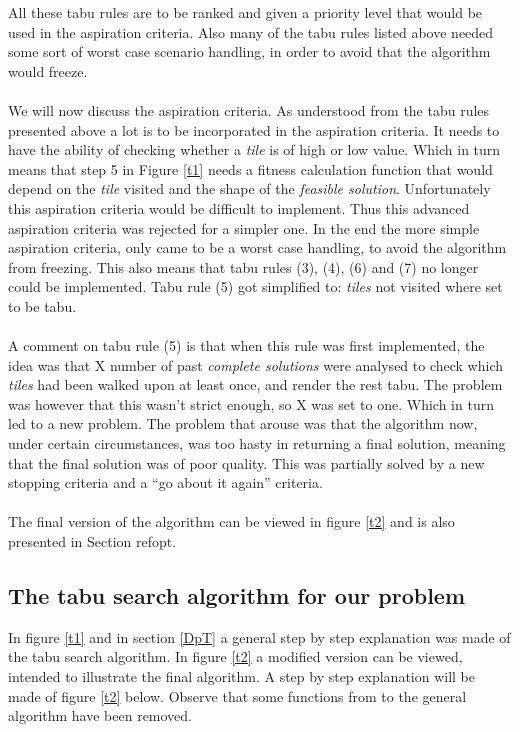 All these tabu rules are to be ranked and given a priority level that would be used in the aspiration criteria. Also many of the tabu rules listed above needed some sort of worst case scenario handling, in order to avoid that the algorithm would freeze.\\
\\We will now discuss the aspiration criteria. As understood from the tabu rules presented above a lot is to be incorporated in the aspiration criteria. It needs to have the ability of checking whether a \emph{tile} is of high or low value. Which in turn means that step 5 in Figure \ref{t1} needs a fitness calculation function that would depend on the \emph{tile} visited and the shape of the \emph{feasible solution}. Unfortunately this aspiration criteria would be difficult to implement. Thus this advanced aspiration criteria was rejected for a simpler one. In the end the more simple aspiration criteria, only came to be a worst case handling, to avoid the algorithm from freezing. This also means that tabu rules (3), (4), (6) and (7) no longer could be implemented. Tabu rule (5) got simplified to: \emph{tiles} not visited where set to be tabu.\\
\\A comment on tabu rule (5) is that when this rule was first implemented, the idea was that X number of past \emph{complete solutions} were analysed to check which \emph{tiles} had been walked upon at least once, and render the rest tabu. The problem was however that this wasn't strict enough, so X was set to one. Which in turn led to a new problem. The problem that arouse was that the algorithm now, under certain circumstances, was too hasty in returning a final solution, meaning that the final solution was of poor quality. This was partially solved by a new stopping criteria and a ``go about it again'' criteria.\\
\\The final version of the algorithm can be viewed in figure \ref{t2} and is also presented in Section ref{opt}.
\subsection{The tabu search algorithm for our problem}\label{opt}
In figure \ref{t1} and in section \ref{DpT} a general step by step explanation was made of the tabu search algorithm. In figure \ref{t2} a modified version can be viewed, intended to illustrate the final algorithm. A step by step explanation will be made of figure \ref{t2} below. Observe that some functions from to the general algorithm have been removed.\\

